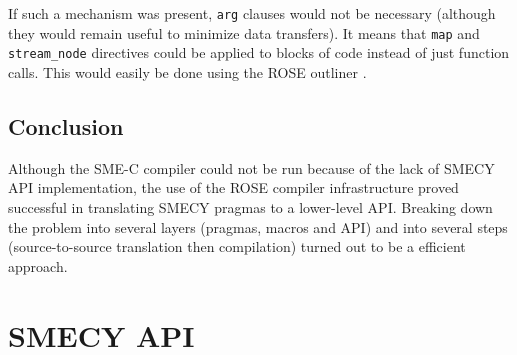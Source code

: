 \documentclass [A4]{article}
\begin{document}
	If such a mechanism was present, \verb+arg+ clauses would not be necessary (although they would remain useful to minimize data transfers). It means that \verb+map+ and \verb+stream_node+ directives could be applied to blocks of code instead of just function calls. This would easily be done using the ROSE outliner \cite{tuto,outliner}.
	
	\subsection{Conclusion}
	Although the SME-C compiler could not be run because of the lack of SMECY API implementation, the use of the ROSE compiler infrastructure proved successful in translating SMECY pragmas to a lower-level API. Breaking down the problem into several layers (pragmas, macros and API) and into several steps (source-to-source translation then compilation) turned out to be a efficient approach.
	
	
	\newpage
	\appendix
	\section{SMECY API}
	\label{api}
\end{document}
